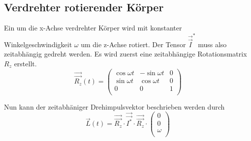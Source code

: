 \subsection{Verdrehter rotierender K\"orper}

Ein um die x-Achse verdrehter K\"orper wird mit konstanter Winkelgeschwindigkeit
$\omega$  um  die  z-Achse  rotiert.  Der  Tensor  $\vec{\vec{I}}^*$  muss  also
zeitabh\"angig   gedreht   werden.   Es   wird   zuerst   eine   zeitabh\"angige
Rotationsmatrix $R_z$ erstellt.
\begin{equation}
    \vec{\vec{R_z}}(t) =
    \begin{pmatrix}
        \cos{\omega t} & -\sin{\omega t} & 0 \\
        \sin{\omega t} & \cos{\omega t}  & 0 \\
        0              & 0               & 1 \\
    \end{pmatrix}
\end{equation}

Nun kann der zeitabh\"aniger Drehimpulsvektor beschrieben werden durch
\begin{equation}
    \vec{L}(t) = \vec{\vec{R_z}} \cdot \vec{\vec{I^*}} \cdot \vec{\vec{R_z}} \cdot
    \begin{pmatrix}
        0      \\
        0      \\
        \omega \\
    \end{pmatrix}
\end{equation}


